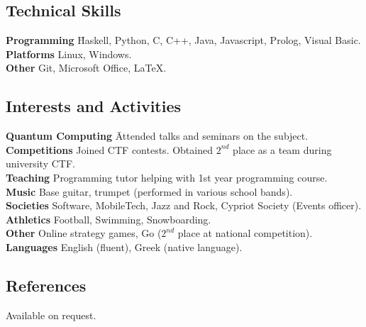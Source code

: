 \documentclass[a4paper,10pt]{article}
\begin{document}
\subsection*{Technical Skills}
\begin{tabbing}
{\bf Programming} \hspace{3pt} \= Haskell, Python, C, C++, Java, Javascript, Prolog, Visual Basic.\\
{\bf Platforms} \> Linux, Windows.\\
{\bf Other} \> Git, Microsoft Office, \LaTeX.
\\
\end{tabbing}

\subsection*{Interests and Activities}
\begin{tabbing}
{\bf Quantum Computing} \hspace{3pt} \= Attended talks and seminars on the subject.\\
{\bf Competitions}  \> Joined CTF contests. Obtained $2^{nd}$ place as a team during university CTF.\\
{\bf Teaching}  \> Programming tutor helping with 1st year programming course.\\
{\bf Music} \> Base guitar, trumpet (performed in various school bands).\\
{\bf Societies} \> Software, MobileTech, Jazz and Rock, Cypriot Society (Events officer).\\
{\bf Athletics} \> Football, Swimming, Snowboarding.\\
{\bf Other} \> Online strategy games, Go ($2^{nd}$ place at national competition).\\
{\bf Languages} \> English (fluent), Greek (native language).\\
\end{tabbing}

\subsection*{References}
Available on request.
\end{document}
